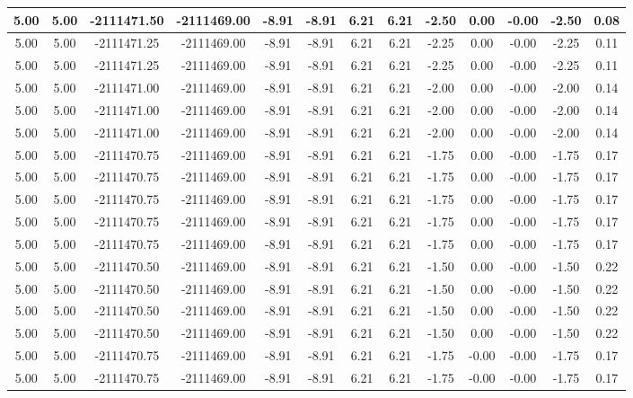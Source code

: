 \begin{table}[htbp]
\begin{adjustbox}{angle=90}
\begin{tabular}{|c|c|c|c|c|c|c|c|c|c|c|c|c|}
 5.00 & 5.00 & -2111471.50 & -2111469.00 & -8.91 & -8.91 & 6.21 & 6.21 & -2.50 & 0.00 & -0.00 & -2.50 & 0.08\\ \hline
 5.00 & 5.00 & -2111471.25 & -2111469.00 & -8.91 & -8.91 & 6.21 & 6.21 & -2.25 & 0.00 & -0.00 & -2.25 & 0.11\\ \hline
 5.00 & 5.00 & -2111471.25 & -2111469.00 & -8.91 & -8.91 & 6.21 & 6.21 & -2.25 & 0.00 & -0.00 & -2.25 & 0.11\\ \hline
 5.00 & 5.00 & -2111471.00 & -2111469.00 & -8.91 & -8.91 & 6.21 & 6.21 & -2.00 & 0.00 & -0.00 & -2.00 & 0.14\\ \hline
 5.00 & 5.00 & -2111471.00 & -2111469.00 & -8.91 & -8.91 & 6.21 & 6.21 & -2.00 & 0.00 & -0.00 & -2.00 & 0.14\\ \hline
 5.00 & 5.00 & -2111471.00 & -2111469.00 & -8.91 & -8.91 & 6.21 & 6.21 & -2.00 & 0.00 & -0.00 & -2.00 & 0.14\\ \hline
 5.00 & 5.00 & -2111470.75 & -2111469.00 & -8.91 & -8.91 & 6.21 & 6.21 & -1.75 & 0.00 & -0.00 & -1.75 & 0.17\\ \hline
 5.00 & 5.00 & -2111470.75 & -2111469.00 & -8.91 & -8.91 & 6.21 & 6.21 & -1.75 & 0.00 & -0.00 & -1.75 & 0.17\\ \hline
 5.00 & 5.00 & -2111470.75 & -2111469.00 & -8.91 & -8.91 & 6.21 & 6.21 & -1.75 & 0.00 & -0.00 & -1.75 & 0.17\\ \hline
 5.00 & 5.00 & -2111470.75 & -2111469.00 & -8.91 & -8.91 & 6.21 & 6.21 & -1.75 & 0.00 & -0.00 & -1.75 & 0.17\\ \hline
 5.00 & 5.00 & -2111470.75 & -2111469.00 & -8.91 & -8.91 & 6.21 & 6.21 & -1.75 & 0.00 & -0.00 & -1.75 & 0.17\\ \hline
 5.00 & 5.00 & -2111470.50 & -2111469.00 & -8.91 & -8.91 & 6.21 & 6.21 & -1.50 & 0.00 & -0.00 & -1.50 & 0.22\\ \hline
 5.00 & 5.00 & -2111470.50 & -2111469.00 & -8.91 & -8.91 & 6.21 & 6.21 & -1.50 & 0.00 & -0.00 & -1.50 & 0.22\\ \hline
 5.00 & 5.00 & -2111470.50 & -2111469.00 & -8.91 & -8.91 & 6.21 & 6.21 & -1.50 & 0.00 & -0.00 & -1.50 & 0.22\\ \hline
 5.00 & 5.00 & -2111470.50 & -2111469.00 & -8.91 & -8.91 & 6.21 & 6.21 & -1.50 & 0.00 & -0.00 & -1.50 & 0.22\\ \hline
 5.00 & 5.00 & -2111470.75 & -2111469.00 & -8.91 & -8.91 & 6.21 & 6.21 & -1.75 & -0.00 & -0.00 & -1.75 & 0.17\\ \hline
 5.00 & 5.00 & -2111470.75 & -2111469.00 & -8.91 & -8.91 & 6.21 & 6.21 & -1.75 & -0.00 & -0.00 & -1.75 & 0.17\\ \hline

\end{tabular}
\end{adjustbox}
\end{table}
